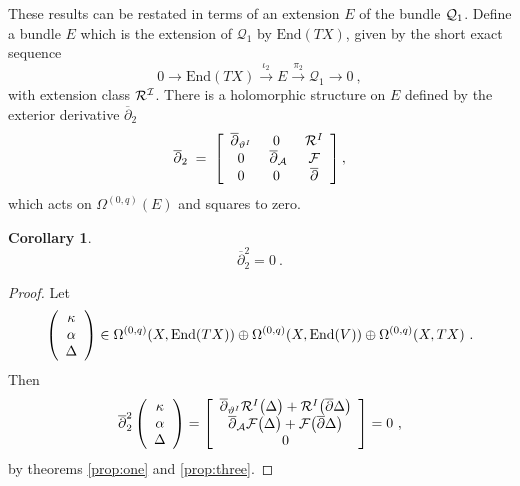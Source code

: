 \documentclass[12pt,a4paper]{article}
\def\bar#1{\overline{#1}}
\def\End{\textrm{End}}
\def\bp{\bar{\partial}}
\def\Q{\mathcal{Q}}
\newtheorem{Cor}{Corollary}
\theoremstyle{definition}
\begin{document}
These results can be restated in terms of an extension $E$ of the bundle ${\cal Q}_1$. Define a bundle $E$ which is the extension of $\Q_1$ by $\End(TX)$, given by the short exact sequence
 \begin{equation}
  0\rightarrow \End(TX)\xrightarrow{\iota_2} E \xrightarrow{\pi_2} \Q_1 \rightarrow 0~,
  \label{eq:ses2}
  \end{equation}
  with extension class $\cal R^I$. 
 There is a holomorphic structure on $E$ defined by the exterior derivative $\bar\partial_2$ 
 \begin{equation*}
\bp_2\;=\; 
\left[ \begin{array}{ccc}
\bp_{\vartheta^I} & 0 &\; {\cal R}^I\\
0 & \;\bp_{\cal A} & \;{\cal F} \\
0  &  0  & \;\bp  \end{array} \right],
\end{equation*}
which acts on $\Omega^{(0,q)}(E)$ and squares to zero.  

\begin{Cor}\label{prop:four}
\[\bp_2^2 = 0~.\]
\end{Cor}

\begin{proof}
Let
\begin{equation*}
\left(
\begin{array}{c}
\kappa\\ \alpha\\ \Delta
\end{array}\right)
\in \Omega^{(0,q)}(X, {\rm End}(TX)) \oplus\Omega^{(0,q)}(X,{\rm End}(V)) \oplus \Omega^{(0,q)}(X, TX)~.
\end{equation*}
Then 
\begin{equation*}
\bp_2^2 
\left(
\begin{array}{c}
\kappa\\\alpha\\ \Delta
\end{array}\right) =
\left[ 
\begin{array}{c}
\bp_{\vartheta^I}{\cal R}^I\big(\Delta\big) +  {\cal R}^I\big(\bp\Delta\big) \\
\bp_{\cal A}{\cal F}\big(\Delta\big) +  {\cal F}\big(\bp\Delta\big) \\
0    \end{array} 
\right] = 0~,
\end{equation*}
by theorems \ref{prop:one} and \ref{prop:three}.
\end{proof}
\vskip10pt
\end{document}
